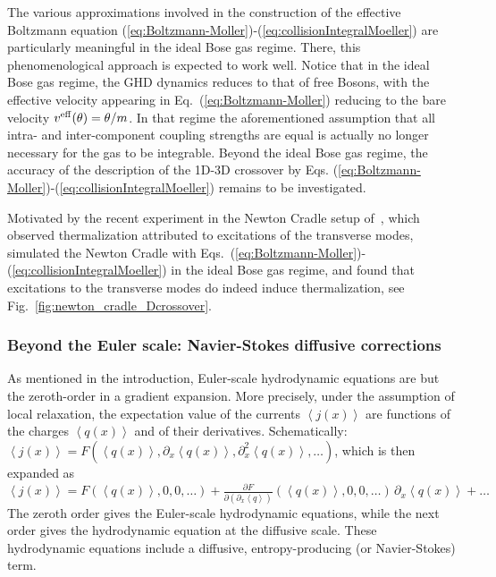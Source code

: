 \documentclass[onecolumn,amsfonts,showpacs,superscriptaddress]{revtex4-1}
\begin{document}
The various approximations involved in the construction of the effective Boltzmann equation (\ref{eq:Boltzmann-Moller})-(\ref{eq:collisionIntegralMoeller}) are particularly meaningful in the ideal Bose gas regime. There, this phenomenological approach is expected to work well. Notice that in the ideal Bose gas regime, the GHD dynamics reduces to that of free Bosons, with the effective velocity appearing in Eq.~(\ref{eq:Boltzmann-Moller}) reducing to the bare velocity $v^{\rm eff} (\theta) = \theta/m$. In that regime the aforementioned assumption that all intra- and inter-component coupling strengths are equal is actually no longer necessary for the gas to be integrable. Beyond the ideal Bose gas regime, the accuracy of the description of the 1D-3D crossover by Eqs. (\ref{eq:Boltzmann-Moller})-(\ref{eq:collisionIntegralMoeller}) remains to be investigated.




Motivated by the recent experiment in the Newton Cradle setup of~\cite{li_relaxation_2020}, which observed thermalization attributed to excitations of the transverse modes, \cite{moller_extension_2021} simulated the Newton Cradle with Eqs.~(\ref{eq:Boltzmann-Moller})-(\ref{eq:collisionIntegralMoeller}) in the ideal Bose gas regime, and found that excitations to the transverse modes do indeed induce thermalization, see Fig.~\ref{fig:newton_cradle_Dcrossover}.






\subsubsection{Beyond the Euler scale: Navier-Stokes diffusive corrections}
\label{sec:diffusive_corrections}

As mentioned in the introduction, Euler-scale hydrodynamic equations are but the zeroth-order in a gradient expansion. More precisely, under the assumption of local relaxation, the expectation value of the currents $\left<j(x)\right>$ are functions of the charges $\left< q(x) \right>$ and of their derivatives. Schematically: $\left<j(x)\right> = F(\left< q(x) \right>, \partial_x \left< q(x) \right>, \partial_x^2 \left< q(x) \right>, \dots)$, which is then expanded as $\left<j(x)\right> = F(\left< q(x) \right>, 0, 0, \dots) + \frac{\partial F}{\partial (\partial_x \left< q \right>)}(\left< q(x) \right>, 0, 0, \dots) \, \partial_x \left< q(x) \right>  +  \dots$ The zeroth order gives the Euler-scale hydrodynamic equations, while the next order gives the hydrodynamic equation at the diffusive scale. These hydrodynamic equations include a diffusive, entropy-producing (or Navier-Stokes) term.
\end{document}
